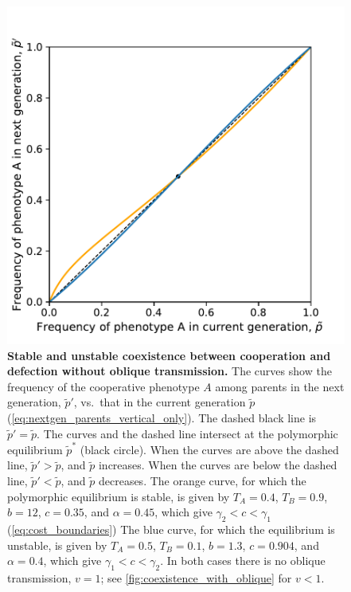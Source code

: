 \documentclass[12pt]{extarticle}
\begin{document}
{%
\begin{figure}[h]
\centering
\includegraphics[scale = 0.55]{coexistence_without_oblique.pdf}
\caption{\textbf{Stable and unstable coexistence between cooperation and defection without oblique transmission.}
  The curves show the frequency of the cooperative phenotype $A$ among parents in the next generation, $\tilde{p}'$, vs.\ that in the current generation $\tilde{p}$ (\autoref{eq:nextgen_parents_vertical_only}).
  The dashed black line is $\tilde{p}'=\tilde{p}$.
  The curves and the dashed line intersect at the polymorphic equilibrium $\tilde{p}^*$ (black circle).
  When the curves are above the dashed line, $\tilde{p}'>\tilde{p}$, and $\tilde{p}$ increases.
  When the curves are below the dashed line, $\tilde{p}'<\tilde{p}$, and $\tilde{p}$ decreases.
  The orange curve, for which the polymorphic equilibrium is stable, is given by $T_A = 0.4$, $T_B = 0.9$, $b = 12$, $c=0.35$, and $\alpha = 0.45$, which give $\gamma_2<c<\gamma_1$ (\autoref{eq:cost_boundaries})
  The blue curve, for which the equilibrium is unstable, is given by $T_A = 0.5$, $T_B = 0.1$, $b = 1.3$, $c=0.904$, and $\alpha = 0.4$, which give $\gamma_1<c<\gamma_2$.
  In both cases there is no oblique transmission, $v=1$; see \autoref{fig:coexistence_with_oblique} for $v<1$.
  }
\label{fig:coexistence_without_oblique}
\end{figure}



}
\end{document}

